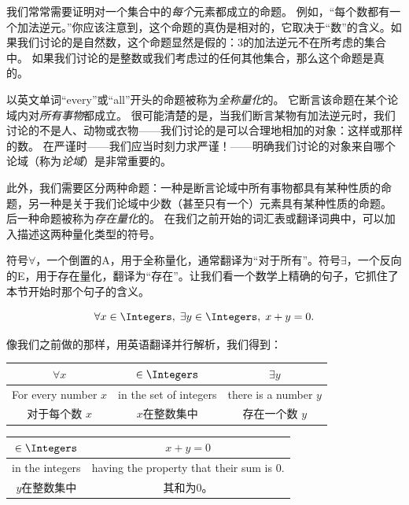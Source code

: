 我们常常需要证明对一个集合中的{\em 每个}元素都成立的命题。
例如，“每个数都有一个加法逆元。”你应该注意到，这个命题的真伪是相对的，它取决于“数”的含义。如果我们讨论的是自然数，这个命题显然是假的：3的加法逆元不在所考虑的集合中。
如果我们讨论的是整数或我们考虑过的任何其他集合，那么这个命题是真的。

以英文单词“every”或“all”开头的命题被称为\emph{全称量化}的。
它断言该命题在某个论域内对{\em 所有事物}都成立。
很可能清楚的是，当我们断言某物有加法逆元时，我们讨论的不是人、动物或衣物——我们讨论的是可以合理地相加的对象：这样或那样的数。
在严谨时——我们应当时刻力求严谨！——明确我们讨论的对象来自哪个论域（称为\emph{论域}）是非常重要的。

此外，我们需要区分两种命题：一种是断言论域中所有事物都具有某种性质的命题，另一种是关于我们论域中少数（甚至只有一个）元素具有某种性质的命题。
后一种命题被称为\emph{存在量化}的。
在我们之前开始的词汇表或翻译词典中，可以加入描述这两种量化类型的符号。


符号$\forall$，一个倒置的A，用于全称量化，通常翻译为“对于所有”。符号$\exists$，一个反向的E，用于存在量化，翻译为“存在”。让我们看一个数学上精确的句子，它抓住了本节开始时那个句子的含义。

\[ \forall x \in \Integers, \; \exists y \in \Integers, \; x+y=0.
\]


像我们之前做的那样，用英语翻译并行解析，我们得到：

\vspace{.2in}

\begin{tabular}{c|c|c}
  \rule[-10pt]{0pt}{22pt} $\forall x$         & $\in \Integers$        & $\exists y$    \\ \hline
  \rule[-6pt]{0pt}{22pt} For every number $x$ & in the set of integers &
  there is a number $y$                                                                 \\
  \rule[-6pt]{0pt}{22pt} 对于每个数 $x$       & $x$在整数集中             & 存在一个数 $y$ \\
\end{tabular}

\vspace{.2in}

\begin{tabular}{c|c}
  \rule[-10pt]{0pt}{22pt} $\in \Integers$ & $x+y=0$                  \\ \hline
  \rule[-6pt]{0pt}{22pt} in the integers  & having the property that
  their sum is $0$.                                                  \\
  \rule[-6pt]{0pt}{22pt} $y$在整数集中       & 其和为0。                \\
\end{tabular}



